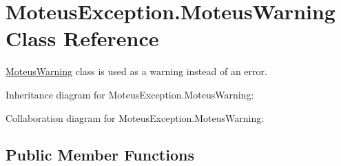 \hypertarget{classMoteusException_1_1MoteusWarning}{}\section{Moteus\+Exception.\+Moteus\+Warning Class Reference}
\label{classMoteusException_1_1MoteusWarning}


\hyperlink{classMoteusException_1_1MoteusWarning}{Moteus\+Warning} class is used as a warning instead of an error.  




Inheritance diagram for Moteus\+Exception.\+Moteus\+Warning\+:


Collaboration diagram for Moteus\+Exception.\+Moteus\+Warning\+:
\subsection*{Public Member Functions}
